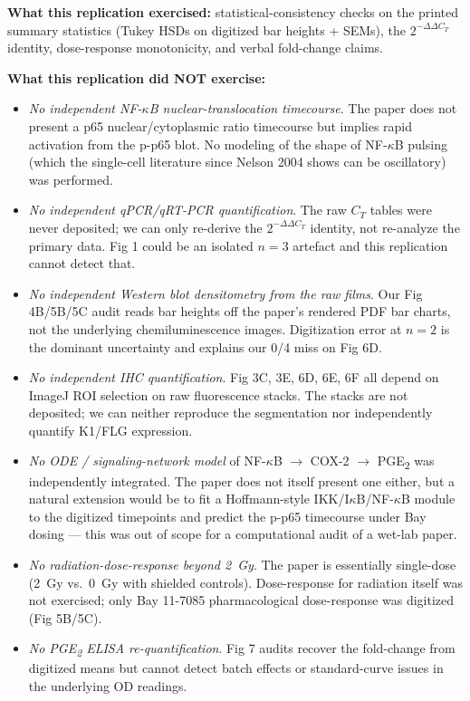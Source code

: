 \documentclass[11pt]{article}
\begin{document}
\textbf{What this replication exercised:} statistical-consistency checks on the printed summary statistics (Tukey HSDs on digitized bar heights + SEMs), the $2^{-\Delta\Delta C_T}$ identity, dose-response monotonicity, and verbal fold-change claims.

\textbf{What this replication did NOT exercise:}
\begin{itemize}
    \item \emph{No independent NF-$\kappa$B nuclear-translocation timecourse}. The paper does not present a p65 nuclear/cytoplasmic ratio timecourse but implies rapid activation from the p-p65 blot. No modeling of the shape of NF-$\kappa$B pulsing (which the single-cell literature since Nelson 2004 shows can be oscillatory) was performed.
    \item \emph{No independent qPCR/qRT-PCR quantification}. The raw $C_T$ tables were never deposited; we can only re-derive the $2^{-\Delta\Delta C_T}$ identity, not re-analyze the primary data. Fig 1 could be an isolated $n=3$ artefact and this replication cannot detect that.
    \item \emph{No independent Western blot densitometry from the raw films}. Our Fig 4B/5B/5C audit reads bar heights off the paper's rendered PDF bar charts, not the underlying chemiluminescence images. Digitization error at $n=2$ is the dominant uncertainty and explains our 0/4 miss on Fig 6D.
    \item \emph{No independent IHC quantification}. Fig 3C, 3E, 6D, 6E, 6F all depend on ImageJ ROI selection on raw fluorescence stacks. The stacks are not deposited; we can neither reproduce the segmentation nor independently quantify K1/FLG expression.
    \item \emph{No ODE / signaling-network model} of NF-$\kappa$B $\to$ COX-2 $\to$ PGE\textsubscript{2} was independently integrated. The paper does not itself present one either, but a natural extension would be to fit a Hoffmann-style IKK/I$\kappa$B/NF-$\kappa$B module to the digitized timepoints and predict the p-p65 timecourse under Bay dosing --- this was out of scope for a computational audit of a wet-lab paper.
    \item \emph{No radiation-dose-response beyond 2~Gy}. The paper is essentially single-dose (2~Gy vs.\ 0~Gy with shielded controls). Dose-response for radiation itself was not exercised; only Bay 11-7085 pharmacological dose-response was digitized (Fig 5B/5C).
    \item \emph{No PGE\textsubscript{2} ELISA re-quantification}. Fig 7 audits recover the fold-change from digitized means but cannot detect batch effects or standard-curve issues in the underlying OD readings.
\end{itemize}
\end{document}
